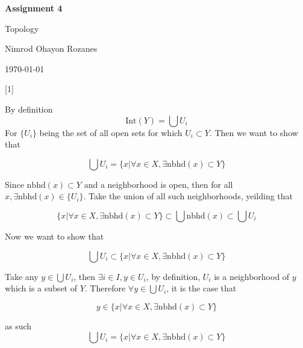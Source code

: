 \documentclass{article} %
\newcommand{\question}[2][]{
  \begin{flushleft}
    \textbf{Question #1}: \textit{#2}

\end{flushleft}}
\newcommand{\maketitletwo}[2][]{
  \begin{center}
    \Large{\textbf{Assignment #1}

    Topology} %
    \vspace{5pt}

    \normalsize{Nimrod Ohayon Rozanes  %

    \today}        %
    \vspace{15pt}

\end{center}}
\begin{document}
\maketitletwo[4]  %

\question[1]{}

By definition
$$
\text{Int}(Y) = \bigcup U_i
$$
For $\{U_i\}$ being the set of all open sets for which $U_i \subset
Y$. Then we want to show that

\[
  \bigcup U_i = \{x \vert \forall x \in X, \exists
  \text{nbhd}(x) \subset Y\}
\]

Since $\text{nbhd}(x) \subset Y$ and a neighborhood is open, then for
all $x, \exists \text{nbhd}(x) \in \{U_i\}$. Take the union of all
such neighborhoods, yeilding that

$$
\{x \vert \forall x \in X, \exists
\text{nbhd}(x) \subset Y\} \subset \bigcup \text{nbhd}(x) \subset \bigcup U_i
$$

Now we want to show that

\[
  \bigcup U_i \subset \{x \vert \forall x \in X, \exists
  \text{nbhd}(x) \subset Y\}
\]

Take any $y \in \bigcup U_i$, then $\exists i \in I, y \in U_i$, by
definition, $U_i$ is a neighborhood of $y$ which is a subset of $Y$.
Therefore $\forall y \in \bigcup U_i$, it is the case that

\[
  y  \in \{x \vert \forall x \in X, \exists \text{nbhd}(x) \subset Y\}
\]

as such
\[
  \bigcup U_i = \{x \vert \forall x \in X, \exists \text{nbhd}(x) \subset Y\}
\]
\end{document}
